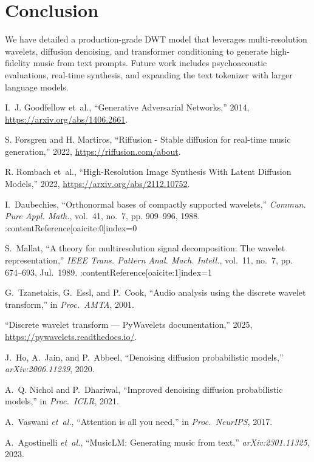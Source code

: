 \documentclass[12pt]{report}
\begin{document}
\chapter{Conclusion}

We have detailed a production-grade DWT model that leverages multi-resolution wavelets, diffusion denoising, and transformer conditioning to generate high-fidelity music from text prompts. Future work includes psychoacoustic evaluations, real-time synthesis, and expanding the text tokenizer with larger language models.

\begin{thebibliography}{99}

I.~J. Goodfellow et~al., “Generative Adversarial Networks,” 2014, \url{https://arxiv.org/abs/1406.2661}.

S. Forsgren and H. Martiros, “Riffusion - Stable diffusion for real-time music generation,” 2022, \url{https://riffusion.com/about}.

R. Rombach et~al., “High-Resolution Image Synthesis With Latent Diffusion Models,” 2022, \url{https://arxiv.org/abs/2112.10752}.

I.~Daubechies, “Orthonormal bases of compactly supported wavelets,”
  \emph{Commun. Pure Appl. Math.}, vol.~41, no.~7, pp. 909--996, 1988. :contentReference[oaicite:0]{index=0}

S.~Mallat, “A theory for multiresolution signal decomposition: The wavelet
  representation,” \emph{IEEE Trans. Pattern Anal. Mach. Intell.}, vol.~11,
  no.~7, pp. 674--693, Jul.\ 1989. :contentReference[oaicite:1]{index=1}

G.~Tzanetakis, G.~Essl, and P.~Cook, “Audio analysis using the discrete
  wavelet transform,” in \emph{Proc.\ AMTA}, 2001.

“Discrete wavelet transform — PyWavelets documentation,” 2025,
  \url{https://pywavelets.readthedocs.io/}. 

J.~Ho, A.~Jain, and P.~Abbeel, “Denoising diffusion probabilistic models,”
  \emph{arXiv:2006.11239}, 2020. 

A.~Q. Nichol and P.~Dhariwal, “Improved denoising diffusion probabilistic
  models,” in \emph{Proc.\ ICLR}, 2021. 

A.~Vaswani \emph{et~al.}, “Attention is all you need,” in \emph{Proc.\ NeurIPS},
  2017. 

A.~Agostinelli \emph{et~al.}, “MusicLM: Generating music from text,”
  \emph{arXiv:2301.11325}, 2023. 

\end{thebibliography}
\end{document}
